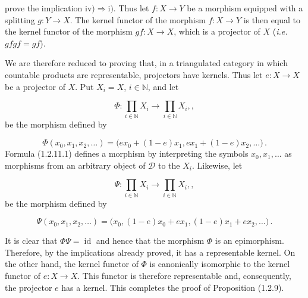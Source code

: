 \clearpage
{}%
\begingroup
\small
\setlength{\emergencystretch}{1.5em}%
\setlength{\abovedisplayskip}{4pt plus 2pt minus 2pt}%
\setlength{\belowdisplayskip}{4pt plus 2pt minus 2pt}%

prove the implication $\mathrm{iv)}\Longrightarrow\mathrm{i)}$. Thus let
$f\colon X\longrightarrow Y$ be a morphism equipped with a splitting
$g\colon Y\longrightarrow X$. The kernel functor of the morphism
$f\colon X\longrightarrow Y$ is then equal to the kernel functor of the
morphism $gf\colon X\longrightarrow X$, which is a projector of $X$
({\itshape i.e.} $gfgf=gf$).

We are therefore reduced to proving that, in a triangulated category in
which countable products are representable, projectors have kernels. Thus
let $e\colon X\longrightarrow X$ be a projector of $X$. Put $X_i=X$,
$i\in\mathbb N$, and let

\[
  \Phi\colon\prod_{i\in\mathbb N}X_i\longrightarrow
  \prod_{i\in\mathbb N}X_i, ,
\]
be the morphism defined by

\begin{equation}
  \Phi(x_0,x_1,x_2,\ldots)
  =\bigl(ex_0+(1-e)x_1,ex_1+(1-e)x_2,\ldots\bigr)\,.
  \tag{1.2.11.1}
\end{equation}
Formula (1.2.11.1) defines a morphism by interpreting the symbols
$x_0,x_1,\ldots$ as morphisms from an arbitrary object of $\mathcal D$ to
the $X_i$. Likewise, let

\[
  \Psi\colon\prod_{i\in\mathbb N}X_i\longrightarrow
  \prod_{i\in\mathbb N}X_i, ,
\]
be the morphism defined by

\begin{equation}
  \Psi(x_0,x_1,x_2,\ldots)
  =\bigl(x_0,(1-e)x_0+ex_1,(1-e)x_1+ex_2,\ldots\bigr)\,.
  \tag{1.2.11.2}
\end{equation}

It is clear that $\Phi\Psi=\operatorname{id}$ and hence that the morphism
$\Phi$ is an epimorphism. Therefore, by the implications already proved,
it has a representable kernel. On the other hand, the kernel functor of
$\Phi$ is canonically isomorphic to the kernel functor of
$e\colon X\longrightarrow X$. This functor is therefore representable and,
consequently, the projector $e$ has a kernel. This completes the proof of
Proposition (1.2.9).

